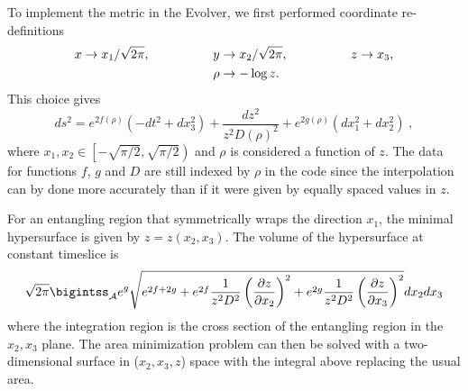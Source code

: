 \documentclass[11 pt]{article}
\begin{document}
To implement the metric in the Evolver, we first performed coordinate re-definitions
\begin{align}
\begin{split}
    x \rightarrow x_1/\sqrt{2\pi}, \hspace{50 pt}
    y &\rightarrow x_2/\sqrt{2\pi}, \hspace{50 pt}
    z \rightarrow x_3, \\
    \rho &\rightarrow -\log{z}.
\end{split}
\end{align}
This choice gives
\begin{equation}\label{torus metric}
    ds^2=e^{2f(\rho)}(-dt^2+dx_3^2) + \frac{dz^2}{z^2 D(\rho)^2} + e^{2g(\rho)}(dx_1^2+dx_2^2)\;,
\end{equation}
where $x_1,x_2 \in \left[-\sqrt{\pi/2},\sqrt{\pi/2}\right)$ and $\rho$ is considered a function of $z$. The data for functions $f$, $g$ and $D$ are still indexed by $\rho$ in the code since the interpolation can by done more accurately than if it were given by equally spaced values in $z$.

For an entangling region that symmetrically wraps the direction $x_1$, the minimal hypersurface is given by $z=z(x_2, x_3)$. The volume of the hypersurface at constant timeslice is
\begin{equation}\label{torus area integral}
    \sqrt{2\pi}\bigintss_{\cal A} {e^{g}\sqrt{e^{2f+2g}+e^{2f}\frac{1}{z^2 D^2}\left(\frac{\partial z}{\partial x_2}\right)^2 + e^{2g}\frac{1}{z^2 D^2}\left(\frac{\partial z}{\partial x_3}\right)^2}dx_2 dx_3}
\end{equation}
where the integration region is the cross section of the entangling region in the $x_2,x_3$ plane. The area minimization problem can then be solved with a two-dimensional surface in ($x_2,x_3,z$) space with the integral above replacing the usual area.
\end{document}
